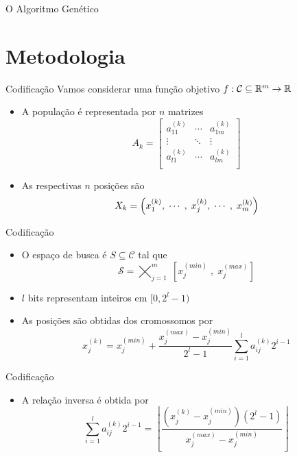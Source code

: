 \begin{frame}{O Algoritmo Genético}
  
\end{frame}

\section{Metodologia}

\newcommand{\kth}[2]{{#1}^{(k)}_{#2}}
\newcommand{\kpth}[2]{{#1}^{(k + 1)}_{#2}}
\newcommand{\xmin}[1]{x^{(min)}_{#1}}
\newcommand{\xmax}[1]{x^{(max)}_{#1}}

\begin{frame}{Codificação}
  Vamos considerar uma função objetivo $ f : \mathcal{C} \subseteq \mathbb{R}^m \rightarrow \mathbb{R} $
  \begin{itemize}
    \item A população é representada por $n$ matrizes
          $$
            A_k = \left[
              \begin{matrix}
                \kth{a}{11} & \cdots & \kth{a}{1m} \\
                \vdots      & \ddots & \vdots      \\
                \kth{a}{l1} & \cdots & \kth{a}{lm} \\
              \end{matrix}
              \right]
          $$
    \item As respectivas $n$ posições são
          $$ X_k = \left( \kth{x}{1}, \mathdots, \; \kth{x}{j}, \mathdots, \; \kth{x}{m} \right) $$
  \end{itemize}
\end{frame}

\begin{frame}{Codificação}
  \begin{itemize}
    \item O espaço de busca é $S \subseteq \mathcal{C}$ tal que
          $$ \mathcal{S} = \bigtimes_{j = 1}^m \; [ \xmin{j} \; , \; \xmax{j} ] $$
    \item $l$ bits representam inteiros em $ [0, 2^l - 1) $
    \item As posições são obtidas dos cromossomos por
          $$ x^{(k)}_j = \xmin{j} + \frac{\xmax{j} - \xmin{j}}{2^l - 1} \sum_{i = 1}^l \kth{a}{ij} 2^{i - 1} $$
  \end{itemize}
\end{frame}

\begin{frame}{Codificação}
  \begin{itemize}
    \item A relação inversa é obtida por
          $$
            \sum_{i = 1}^l \kth{a}{ij} 2^{i - 1} =
            \left\lfloor \frac{(\kth{x}{j} - \xmin{j})(2^l - 1)}{\xmax{j} - \xmin{j}} \right\rfloor
          $$
  \end{itemize}
\end{frame}

